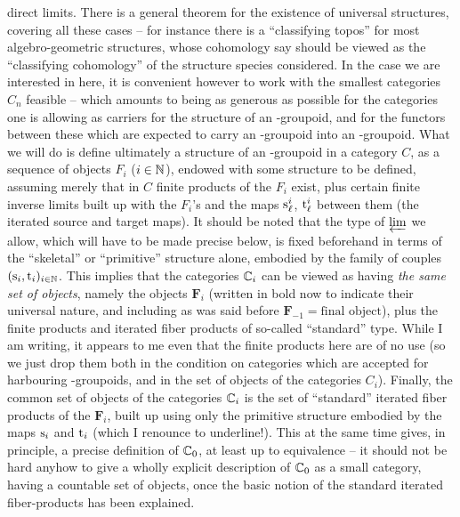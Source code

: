 direct limits. There is a general theorem for the existence of
universal structures, covering all these cases -- for instance there
is a ``classifying topos'' for most algebro-geometric structures,
whose cohomology say should be viewed as the ``classifying
cohomology'' of the structure species considered. In the case we are
interested in here, it is convenient however to work with the smallest
categories $C_n$ feasible -- which amounts to being as generous as
possible for the categories one is allowing as carriers for the
structure of an \oo-groupoid, and for the functors between these which
are expected to carry an \oo-groupoid into an \oo-groupoid. What we
will do is define ultimately a structure of an \oo-groupoid in a
category $C$, as a sequence of objects $F_i$ ($i\in{\ensuremath{\mathbb{N}}}$), endowed with
some structure to be defined, assuming merely that in $C$
finite products of the $F_i$ exist, plus certain finite inverse limits
built up with the $F_i$'s and the maps $\mathrm{s}_\ell^i$, $\mathrm{t}_\ell^i$ between them (the iterated source and target maps). It
should be noted that the type of $\varprojlim$ we allow, which will
have to be made precise below, is fixed beforehand in terms of the
``skeletal'' or ``primitive'' structure alone, embodied by the family
of couples $(\mathrm{s}_i, \mathrm{t}_i)_{i\in{\ensuremath{\mathbb{N}}}}$. This implies that the
categories ${\mathbb{C}}_i$ can be viewed as having \emph{the same set of
  objects}, namely the objects $\boldsymbol F_i$ (written
in bold now to indicate their
universal nature, and including as was said before $\boldsymbol F_{-1} =
\text{final object}$), plus the finite products and iterated fiber
products of so-called ``standard'' type. While I am writing, it
appears to me even that the finite products here are of no use (so we
just drop them both in the condition on categories which are accepted
for harbouring \oo-groupoids, and in the set of objects of the
categories $C_i$). Finally, the common set of objects of the
categories ${\mathbb{C}}_i$ is the set of ``standard'' iterated fiber
products of the $\boldsymbol F_i$, built up using only the primitive
structure embodied by the maps $\mathrm{s}_i$ and $\mathrm{t}_i$ (which I renounce to underline!).
This at the same time gives, in principle, a precise definition of
${\mathbb{C}}_0$, at least up to equivalence -- it should not be hard anyhow
to give a wholly explicit description of ${\mathbb{C}}_0$ as a small
category, having a countable set of objects, once the basic notion of
the standard iterated fiber-products has been explained.

